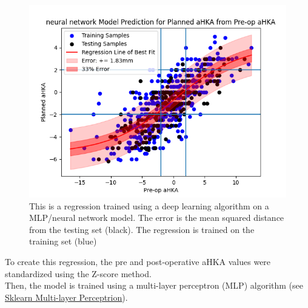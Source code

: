\documentclass{article}
\begin{document}
\begin{figure}[t]
	\includegraphics[width=\textwidth]{neural_network_regression.png}
	\caption{This is a regression trained using a deep learning algorithm on a MLP/neural network model.
	The error is the mean squared distance from the testing set (black). 
	The regression is trained on the training set (blue)}
\end{figure}

To create this regression, the pre and post-operative aHKA values were standardized using the Z-score method.\\
Then, the model is trained using a multi-layer perceptron (MLP) algorithm 
(see \href{https://scikit-learn.org/stable/modules/generated/sklearn.neural_network.MLPRegressor.html}{\underline{Sklearn Multi-layer Perceptrion}}).
\end{document}
